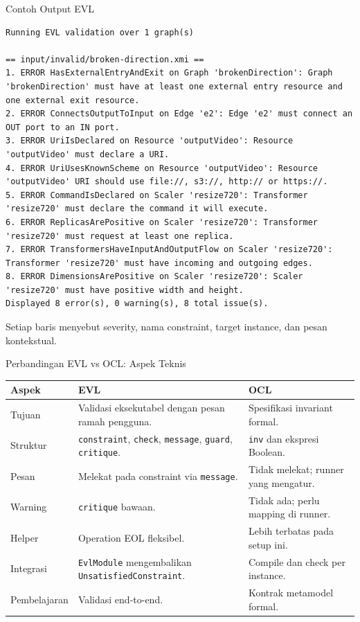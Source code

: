 \documentclass[aspectratio=169, table]{beamer}
\begin{document}
\begin{frame}[fragile]{Contoh Output EVL}
\vspace{2pt}
\begin{lstlisting}[language=shell, basicstyle=\ttfamily\tiny, breaklines=true]
Running EVL validation over 1 graph(s)

== input/invalid/broken-direction.xmi ==
1. ERROR HasExternalEntryAndExit on Graph 'brokenDirection': Graph 'brokenDirection' must have at least one external entry resource and one external exit resource.
2. ERROR ConnectsOutputToInput on Edge 'e2': Edge 'e2' must connect an OUT port to an IN port.
3. ERROR UriIsDeclared on Resource 'outputVideo': Resource 'outputVideo' must declare a URI.
4. ERROR UriUsesKnownScheme on Resource 'outputVideo': Resource 'outputVideo' URI should use file://, s3://, http:// or https://.
5. ERROR CommandIsDeclared on Scaler 'resize720': Transformer 'resize720' must declare the command it will execute.
6. ERROR ReplicasArePositive on Scaler 'resize720': Transformer 'resize720' must request at least one replica.
7. ERROR TransformersHaveInputAndOutputFlow on Scaler 'resize720': Transformer 'resize720' must have incoming and outgoing edges.
8. ERROR DimensionsArePositive on Scaler 'resize720': Scaler 'resize720' must have positive width and height.
Displayed 8 error(s), 0 warning(s), 8 total issue(s).
\end{lstlisting}

\vspace{4pt}
\small
Setiap baris menyebut severity, nama constraint, target instance, dan pesan kontekstual.
\end{frame}

\begin{frame}{Perbandingan EVL vs OCL: Aspek Teknis}
\vspace{2pt}
\scriptsize
\begin{tabular}{|p{}|p{}|p{}|}
\hline
\rowcolor{black!8}
\textbf{Aspek} & \textbf{EVL} & \textbf{OCL} \\
\hline
Tujuan & Validasi eksekutabel dengan pesan ramah pengguna. & Spesifikasi invariant formal. \\
\hline
Struktur & \texttt{constraint}, \texttt{check}, \texttt{message}, \texttt{guard}, \texttt{critique}. & \texttt{inv} dan ekspresi Boolean. \\
\hline
Pesan & Melekat pada constraint via \texttt{message}. & Tidak melekat; runner yang mengatur. \\
\hline
Warning & \texttt{critique} bawaan. & Tidak ada; perlu mapping di runner. \\
\hline
Helper & Operation EOL fleksibel. & Lebih terbatas pada setup ini. \\
\hline
Integrasi & \texttt{EvlModule} mengembalikan \texttt{UnsatisfiedConstraint}. & Compile dan check per instance. \\
\hline
Pembelajaran & Validasi end-to-end. & Kontrak metamodel formal. \\
\hline
\end{tabular}
\end{frame}
\end{document}
